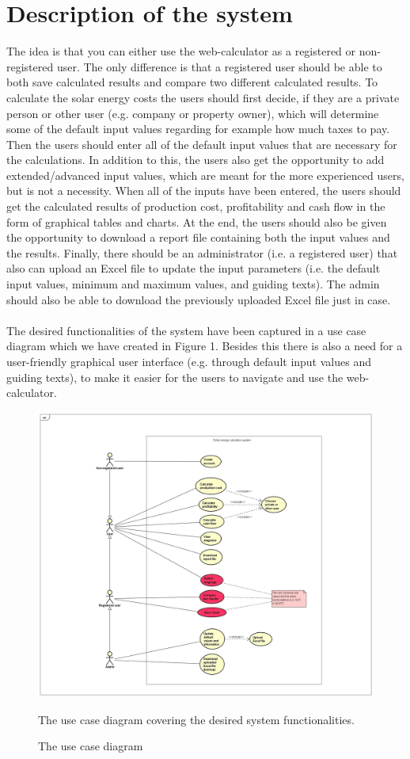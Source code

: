 \documentclass[]{article}
\begin{document}
\section{Description of the system}
The idea is that you can either use the web-calculator as a registered or non-
registered user. The only difference is that a registered user should be able
to both save calculated results and compare two different calculated results. To calculate the solar energy costs the users should first decide, if they are a private person or other user (e.g. company or property owner), which will determine some of the default input values regarding for example how much taxes to pay. Then the users should 
enter all of the default input values that are necessary for the calculations. In
addition to this, the users also get the opportunity to add extended/advanced
input values, which are meant for the more experienced users, but is not a necessity. When all of the inputs have been
entered, the users should get the calculated results of production cost,
profitability and cash flow in the form of graphical tables and charts.
At the end, the users should also be given the opportunity to download a report file
containing both the input values and the results. Finally, there should be an
administrator (i.e. a registered user) that also can upload an Excel file to update
the input parameters (i.e. the default input values, minimum and maximum
values, and guiding texts). The admin should also be able to download the previously uploaded Excel file just in case. 
\\\\
The desired functionalities of the system have been captured in a use case
diagram which we have created in Figure 1. Besides this there is also a need
for a user-friendly graphical user interface (e.g. through default input values
and guiding texts), to make it easier for the users to navigate and use the web-
calculator.

\begin{figure}[H]
\centering
\includegraphics[width=1.0\linewidth]{pic1}
\caption{The use case diagram}
\medskip
\small
The use case diagram covering the desired system functionalities. 
\label{fig:pic1}
\end{figure}
\end{document}
